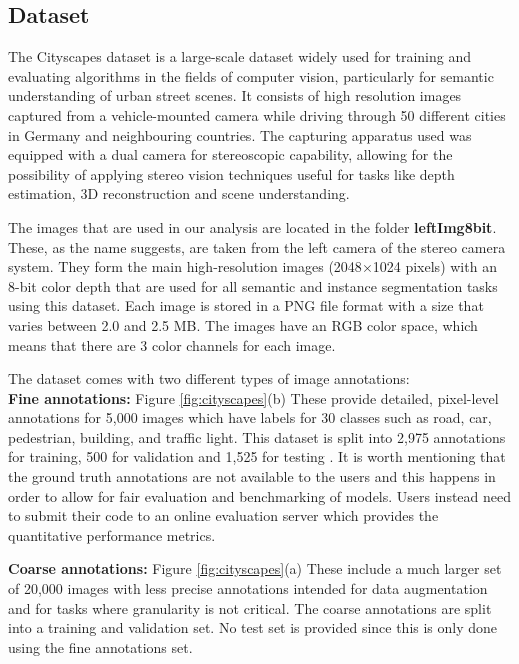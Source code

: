 \subsection{Dataset}

The Cityscapes dataset is a large-scale dataset widely used for training and evaluating algorithms in the fields of computer vision, particularly for semantic understanding of urban street scenes. It consists of high resolution images captured from a vehicle-mounted camera while driving through 50 different cities in Germany and neighbouring countries. The capturing apparatus used was equipped with a dual camera for stereoscopic capability, allowing for the possibility of applying stereo vision techniques useful for tasks like depth estimation, 3D reconstruction and scene understanding. 

The images that are used in our analysis are located in the folder \textbf{leftImg8bit}. These, as the name suggests, are taken from the left camera of the stereo camera system. They form the main high-resolution images (2048$\times$1024 pixels) with an 8-bit color depth that are used for all semantic and instance segmentation tasks using this dataset. Each image is stored in a PNG file format with a size that varies between 2.0 and 2.5 MB. The images have an RGB color space, which means that there are 3 color channels for each image.

The dataset comes with two different types of image annotations:\\
\textbf{Fine annotations:} Figure \ref{fig:cityscapes}(b) These provide detailed, pixel-level annotations for 5,000 images which have labels for 30 classes such as road, car, pedestrian, building, and traffic light. This dataset is split into 2,975 annotations for training, 500 for validation and 1,525 for testing . It is worth mentioning that the ground truth annotations are not available to the users and this happens in order to allow for fair evaluation and benchmarking of models. Users instead need to submit their code to an online evaluation server which provides the quantitative performance metrics.    

\textbf{Coarse annotations:} Figure \ref{fig:cityscapes}(a) These include a much larger set of 20,000 images with less precise annotations intended for data augmentation and for tasks where granularity is not critical. The coarse annotations are split into a training and validation set. No test set is provided since this is only done using the fine annotations set. 

